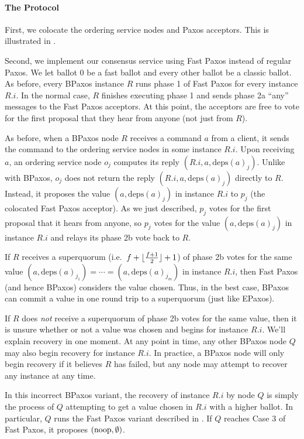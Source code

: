 \documentclass{mwhittaker}
\theoremstyle{definition}
\newcommand{\deps}[1]{\text{deps}(#1)}
\begin{document}
\paragraph{The Protocol}
First, we colocate the ordering service nodes and Paxos acceptors. This is
illustrated in .

{}

Second, we implement our consensus service using Fast Paxos instead of regular
Paxos. We let ballot $0$ be a fast ballot and every other ballot be a classic
ballot. As before, every BPaxos instance $R$ runs phase 1 of Fast Paxos for
every instance $R.i$. In the normal case, $R$ finishes executing phase 1 and
sends phase 2a ``any'' messages to the Fast Paxos acceptors. At this point, the
acceptors are free to vote for the first proposal that they hear from anyone
(not just from $R$).

As before, when a BPaxos node $R$ receives a command $a$ from a client, it
sends the command to the ordering service nodes in some instance $R.i$. Upon
receiving $a$, an ordering service node $o_j$ computes its reply $(R.i, a,
\deps{a}_j)$. Unlike with BPaxos, $o_j$ does not return the reply $(R.i, a,
\deps{a}_j)$ directly to $R$. Instead, it proposes the value $(a, \deps{a}_j)$
in instance $R.i$ to $p_j$ (the colocated Fast Paxos acceptor). As we just
described, $p_j$ votes for the first proposal that it hears from anyone, so
$p_j$ votes for the value $(a, \deps{a}_j)$ in instance $R.i$ and relays its
phase 2b vote back to $R$.

If $R$ receives a superquorum (i.e.\ $f + \lfloor\frac{f+1}{2}\rfloor + 1$) of phase
2b votes for the same value $(a, \deps{a}_{j_1}) = \cdots = (a,
\deps{a}_{j_{m}})$ in instance $R.i$, then Fast Paxos (and hence BPaxos)
considers the value chosen. Thus, in the best case, BPaxos can commit a value
in one round trip to a superquorum (just like EPaxos).

If $R$ does \emph{not} receive a superquorum of phase 2b votes for the same
value, then it is unsure whether or not a value was chosen and begins
 for instance $R.i$. We'll explain recovery in one moment. At
any point in time, any other BPaxos node $Q$ may also begin recovery for
instance $R.i$. In practice, a BPaxos node will only begin recovery if it
believes $R$ has failed, but any node may attempt to recover any instance at
any time.

In this incorrect BPaxos variant, the recovery of instance $R.i$ by node $Q$ is
simply the process of $Q$ attempting to get a value chosen in $R.i$ with a
higher ballot. In particular, $Q$ runs the Fast Paxos variant described in
. If $Q$ reaches Case 3 of Fast Paxos, it proposes $(\text{noop},
\emptyset)$.
\end{document}
